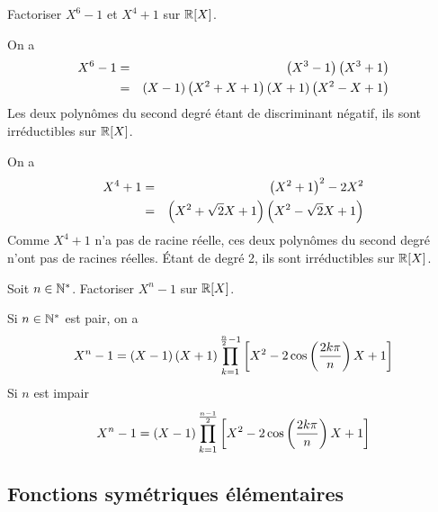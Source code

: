 \documentclass{magnolia}
\begin{document}
\begin{exos}
\exo Factoriser $X^6-1$ et $X^4+1$ sur $\polyR$.
  \begin{sol}
  On a
  \begin{eqnarray*}
  X^6-1
  &=& \left(X^3-1\right)\left(X^3+1\right)\\
  &=& \left(X-1\right)\left(X^2+X+1\right)\left(X+1\right)\left(X^2-X+1\right)
  \end{eqnarray*}
  Les deux polynômes du second degré étant de discriminant négatif, ils
  sont irréductibles sur $\polyR$.  

  On a
  \begin{eqnarray*}
  X^4+1
  &=& \left(X^2+1\right)^2-2X^2\\
  &=& \left(X^2+\sqrt{2}X+1\right)\left(X^2-\sqrt{2}X+1\right)
  \end{eqnarray*}
  Comme $X^4+1$ n'a pas de racine réelle, ces deux polynômes du second degré
  n'ont pas de racines réelles. Étant de degré 2, ils sont irréductibles
  sur $\polyR$.  
  \end{sol}
\exo Soit $n\in{\mathbb{N}^*}$. Factoriser $X^n-1$ sur $\polyR$.
  \begin{sol}
  Si $n\in{\mathbb{N}^*}$ est pair, on a
  \[X^n-1=\left(X-1\right)\left(X+1\right)\prod_{k=1}^{\frac{n}{2}-1}
    \left[X^2-2\cos\left(\frac{2k\pi}{n}\right)X+1\right]\]
  Si $n$ est impair
  \[X^n-1=\left(X-1\right)\prod_{k=1}^{\frac{n-1}{2}}
    \left[X^2-2\cos\left(\frac{2k\pi}{n}\right)X+1\right]\]  
  \end{sol}
\end{exos}

\subsection{Fonctions symétriques élémentaires}
\end{document}
